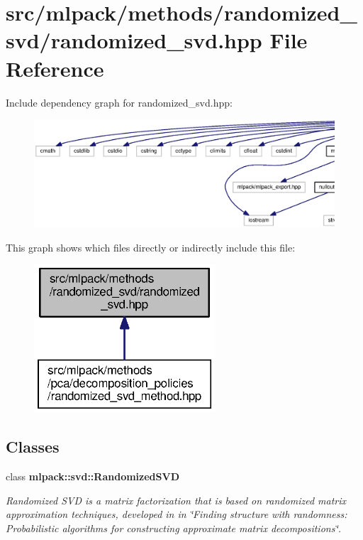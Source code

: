\section{src/mlpack/methods/randomized\+\_\+svd/randomized\+\_\+svd.hpp File Reference}
\label{randomized__svd_8hpp}
Include dependency graph for randomized\+\_\+svd.\+hpp\+:
\nopagebreak
\begin{figure}[H]
\begin{center}
\leavevmode
\includegraphics[width=350pt]{randomized__svd_8hpp__incl}
\end{center}
\end{figure}
This graph shows which files directly or indirectly include this file\+:
\nopagebreak
\begin{figure}[H]
\begin{center}
\leavevmode
\includegraphics[width=191pt]{randomized__svd_8hpp__dep__incl}
\end{center}
\end{figure}
\subsection*{Classes}
\begin{DoxyCompactItemize}
\item 
class {\bf mlpack\+::svd\+::\+Randomized\+S\+VD}
\begin{DoxyCompactList}\small\item\em Randomized S\+VD is a matrix factorization that is based on randomized matrix approximation techniques, developed in in \char`\"{}\+Finding structure with randomness\+:
\+Probabilistic algorithms for constructing approximate matrix decompositions\char`\"{}. \end{DoxyCompactList}\end{DoxyCompactItemize}
